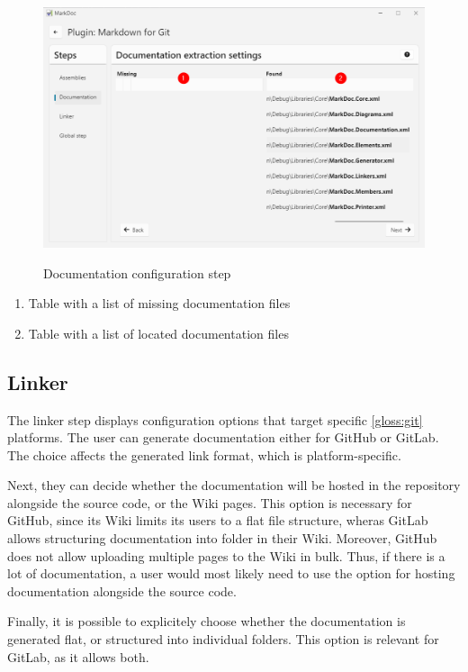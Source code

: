 \begin{figure}[H]
    \caption{Documentation configuration step}
    \includegraphics[width=\linewidth]{img/pluginDocumentation.png}
    \label{fig:pluginDocumentation}
\end{figure}

\begin{enumerate}
    \item Table with a list of missing documentation files
    \item Table with a list of located documentation files
\end{enumerate}

\subsection{Linker}

The linker step displays configuration options that target specific \ref{gloss:git} platforms. The user can generate documentation either for GitHub or GitLab. The choice affects the generated link format, which is platform-specific.

Next, they can decide whether the documentation will be hosted in the repository alongside the source code, or the Wiki pages. This option is necessary for GitHub, since its Wiki limits its users to a flat file structure, wheras GitLab allows structuring documentation into folder in their Wiki. Moreover, GitHub does not allow uploading multiple pages to the Wiki in bulk. Thus, if there is a lot of documentation, a user would most likely need to use the option for hosting documentation alongside the source code.

Finally, it is possible to explicitely choose whether the documentation is generated flat, or structured into individual folders. This option is relevant for GitLab, as it allows both.

